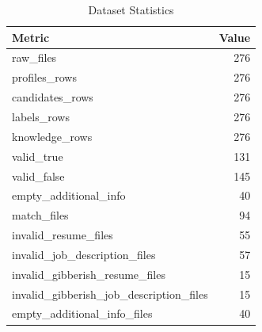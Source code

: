 \begin{table}[t]
\centering
\small
\caption{Dataset Statistics}
\label{tab:dataset_statistics}
\begin{tabular}{lr}
\hline
Metric & Value \\
\hline
raw\_files & 276 \\
profiles\_rows & 276 \\
candidates\_rows & 276 \\
labels\_rows & 276 \\
knowledge\_rows & 276 \\
valid\_true & 131 \\
valid\_false & 145 \\
empty\_additional\_info & 40 \\
match\_files & 94 \\
invalid\_resume\_files & 55 \\
invalid\_job\_description\_files & 57 \\
invalid\_gibberish\_resume\_files & 15 \\
invalid\_gibberish\_job\_description\_files & 15 \\
empty\_additional\_info\_files & 40 \\
\hline
\end{tabular}
\end{table}

